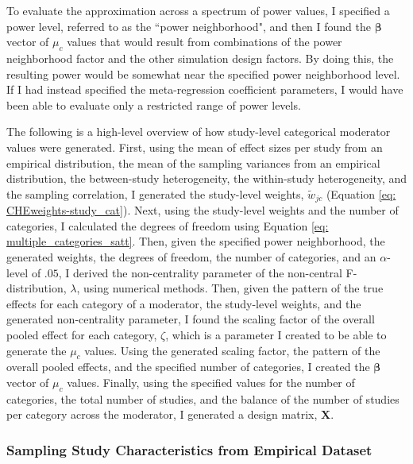 To evaluate the approximation across a spectrum of power values, I specified a power level, referred to as the ``power neighborhood", and then I found the $\bm{\beta}$ vector of $\mu_c$ values that would result from combinations of the power neighborhood factor and the other simulation design factors. By doing this, the resulting power would be somewhat near the specified power neighborhood level. If I had instead specified the meta-regression coefficient parameters, I would have been able to evaluate only a restricted range of power levels.

The following is a high-level overview of how study-level categorical moderator values were generated. First, using the mean of effect sizes per study from an empirical distribution, the mean of the sampling variances from an empirical distribution, the between-study heterogeneity, the within-study heterogeneity, and the sampling correlation, I generated the study-level weights, $\tilde{w}_{jc}$ (Equation \ref{eq: CHEweights-study_cat}). Next, using the study-level weights and the number of categories, I calculated the degrees of freedom using Equation \ref{eq: multiple_categories_satt}. Then, given the specified power neighborhood, the generated weights, the degrees of freedom, the number of categories, and an $\alpha$-level of $.05$, I derived the non-centrality parameter of the non-central F-distribution, $\lambda$, using numerical methods. Then, given the pattern of the true effects for each category of a moderator, the study-level weights, and the generated non-centrality parameter, I found the scaling factor of the overall pooled effect for each category, $\zeta$, which is a parameter I created to be able to generate the $\mu_c$ values. Using the generated scaling factor, the pattern of the overall pooled effects, and the specified number of categories, I created the $\bm{\beta}$ vector of $\mu_c$ values. Finally, using the specified values for the number of categories, the total number of studies, and the balance of the number of studies per category across the moderator, I generated a design matrix, $\bm{X}$.

\subsubsection{Sampling Study Characteristics from Empirical Dataset}

